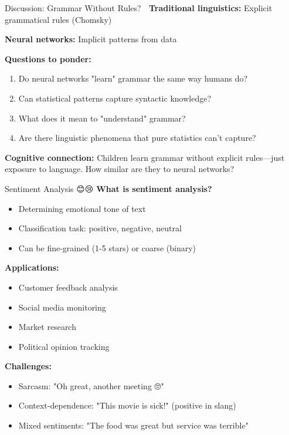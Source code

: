 \documentclass[aspectratio=169]{beamer}
\begin{document}
\begin{frame}{Discussion: Grammar Without Rules? 🤔}
    \textbf{Traditional linguistics:} Explicit grammatical rules (Chomsky)

    \textbf{Neural networks:} Implicit patterns from data

    \vspace{1em}
    \textbf{Questions to ponder:}
    \begin{enumerate}\setlength{\itemsep}{0pt}
        \item Do neural networks "learn" grammar the same way humans do?
        \item Can statistical patterns capture syntactic knowledge?
        \item What does it mean to "understand" grammar?
        \item Are there linguistic phenomena that pure statistics can't capture?
    \end{enumerate}

    \vspace{1em}
    \textbf{Cognitive connection:} Children learn grammar without explicit rules—just exposure to language. How similar are they to neural networks?
\end{frame}

\begin{frame}[shrink=10]{Sentiment Analysis 😊😢}
    \textbf{What is sentiment analysis?}
    \begin{itemize}\setlength{\itemsep}{0pt}
        \item Determining emotional tone of text
        \item Classification task: positive, negative, neutral
        \item Can be fine-grained (1-5 stars) or coarse (binary)
    \end{itemize}

    \vspace{0.5em}
    \textbf{Applications:}
    \begin{itemize}\setlength{\itemsep}{0pt}
        \item Customer feedback analysis
        \item Social media monitoring
        \item Market research
        \item Political opinion tracking
    \end{itemize}

    \vspace{0.5em}
    \textbf{Challenges:}
    \begin{itemize}\setlength{\itemsep}{0pt}
        \item Sarcasm: "Oh great, another meeting 🙄"
        \item Context-dependence: "This movie is sick!" (positive in slang)
        \item Mixed sentiments: "The food was great but service was terrible"
    \end{itemize}
\end{frame}
\end{document}
